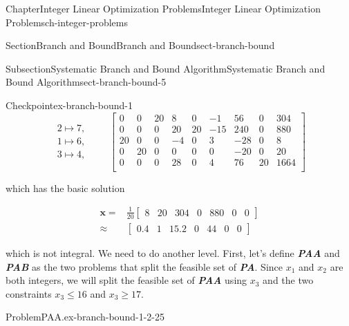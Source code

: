 \documentclass[oneside,10pt,]{book}
\newcommand{\alert}[1]{\textbf{\textit{#1}}}
\numberwithin{equation}{section}
\newcommand{\amp}{&}
\begin{document}
\begin{chapterptx}{Chapter}{Integer Linear Optimization Problems}{}{Integer Linear Optimization Problems}{}{}{ch-integer-problems}
\begin{sectionptx}{Section}{Branch and Bound}{}{Branch and Bound}{}{}{sect-branch-bound}
\begin{subsectionptx}{Subsection}{Systematic Branch and Bound Algorithm}{}{Systematic Branch and Bound Algorithm}{}{}{sect-branch-bound-5}
\begin{inlineexercise}{Checkpoint}{}{ex-branch-bound-1}
\begin{equation*}
\begin{array}{r} 2 \mapsto 7, \\ 1 \mapsto 6, \\ 3 \mapsto 4, \end{array} \qquad \left[\begin{array}{rrr|rrrrr|r} 0 \amp 0 \amp 20 \amp 8 \amp 0 \amp -1 \amp 56 \amp 0 \amp 304\\ 0 \amp 0 \amp 0 \amp 20 \amp 20 \amp -15 \amp 240 \amp 0 \amp 880\\ 20 \amp 0 \amp 0 \amp -4 \amp 0 \amp 3 \amp -28 \amp 0 \amp 8\\ 0 \amp 20 \amp 0 \amp 0 \amp 0 \amp 0 \amp -20 \amp 0 \amp 20\\ \hline 0 \amp 0 \amp 0 \amp 28 \amp 0 \amp 4 \amp 76 \amp 20 \amp 1664\\ \end{array} \right]
\end{equation*}
%
\par
which has the basic solution%
\par
%
\begin{equation*}
\begin{aligned} \boldsymbol{x} = \amp \frac{1}{20} \left[ \begin{array}{rrr|rrrr} 8 \amp 20 \amp 304 \amp 0 \amp 880 \amp 0 \amp 0 \end{array} \right] \\ \approx \amp \left[ \begin{array}{rrr|rrrr} 0.4 \amp 1 \amp 15.2 \amp 0 \amp 44 \amp 0 \amp 0 \end{array} \right] \end{aligned}
\end{equation*}
%
\par
which is not integral. We need to do another level. First, let's define \alert{PAA} and \alert{PAB} as the two problems that split the feasible set of \alert{PA}. Since \(x_1\) and \(x_2\) are both integers, we will split the feasible set of \alert{PAA} using \(x_3\) and the two constraints \(x_3 \leq 16\) and \(x_3 \geq 17\).%
\begin{problem}{Problem}{PAA.}{ex-branch-bound-1-2-25}%
%
\begin{equation*}

\end{equation*}
\end{problem}
\end{inlineexercise}
\end{subsectionptx}
\end{sectionptx}
\end{chapterptx}
\end{document}
